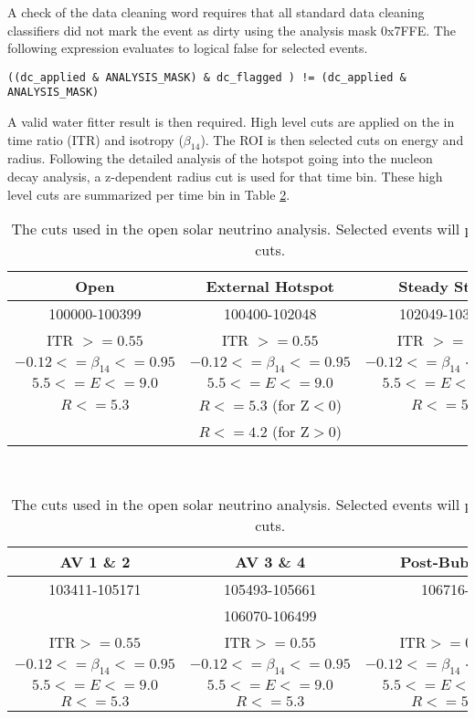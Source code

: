 A check of the data cleaning word requires that all standard data cleaning
classifiers did not mark the event as dirty using the analysis mask 0x7FFE.
The following expression evaluates to logical false for selected events.

\begin{verbatim}
((dc_applied & ANALYSIS_MASK) & dc_flagged ) != (dc_applied & ANALYSIS_MASK)
\end{verbatim}

A valid water fitter result is then required.
High level cuts are applied on the in time ratio (ITR) and isotropy ($\beta_{14}$).
The ROI is then selected cuts on energy and radius.
Following the detailed analysis of the hotspot going into the nucleon decay
analysis, a z-dependent radius cut is used for that time bin.
These high level cuts are summarized per time bin in Table \ref{tbl:solar:roi}.

\begin{table}[]
\begin{center}
\begin{tabular}{c|c|c}
Open & External Hotspot & Steady State  \\ \hline
100000-100399 & 100400-102048 & 102049-103402 \\ \hline
ITR $ >= 0.55$ & ITR $ >= 0.55$ & ITR $ >= 0.55$ \\
$-0.12 <= \beta_{14} <= 0.95$ & $-0.12 <= \beta_{14} <= 0.95$ & $-0.12 <= \beta_{14} <= 0.95$ \\
$5.5 <= E <= 9.0$ & $5.5 <= E <= 9.0$ & $5.5 <= E <= 9.0$ \\
$R <= 5.3$ & $R <= 5.3$ (for Z$<$0) & $R <= 5.3$ \\
 & $R <= 4.2$ (for Z$>$0) & \\
\end{tabular}
\\[2\baselineskip]
\begin{tabular}{c|c|c}
AV 1 \& 2 & AV 3 \& 4 & Post-Bubble \\ \hline
103411-105171 & 105493-105661 & 106716- \\
& 106070-106499 & \\ \hline
ITR$ >= 0.55$ & ITR$ >= 0.55$ & ITR$ >= 0.55$ \\
$-0.12 <= \beta_{14} <= 0.95$ & $-0.12 <= \beta_{14} <= 0.95$ & $-0.12 <= \beta_{14} <= 0.95$ \\
$5.5 <= E <= 9.0$ & $5.5 <= E <= 9.0$ & $5.5 <= E <= 9.0$ \\
$R <= 5.3$ & $R <= 5.3$ & $R <= 5.3$ \\
\end{tabular}
\caption{The cuts used in the open solar neutrino analysis. Selected events will pass these cuts.}
\label{tbl:solar:roi}
\end{center}
\end{table}


